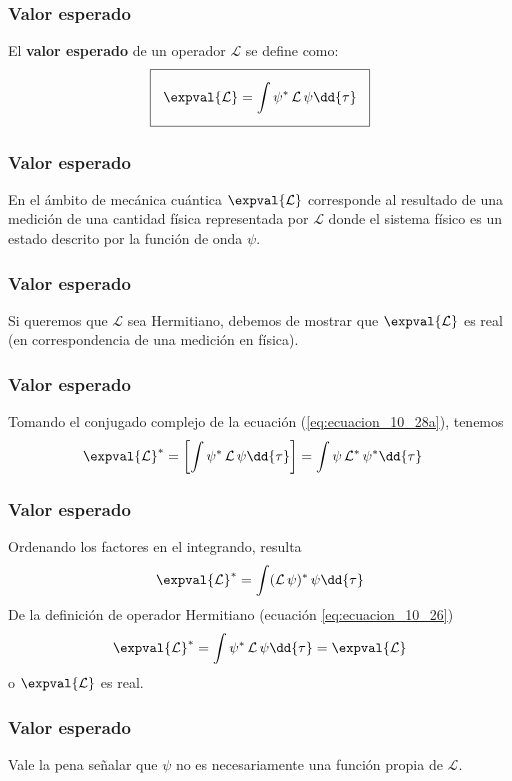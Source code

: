 \begin{frame}
\frametitle{Valor esperado}
El \textbf{valor esperado} de un operador $\mathcal{L}$ se define como:
\begin{align}
\setlength{\fboxsep}{3\fboxsep}\boxed{\expval{\mathcal{L}} = \int \psi^{*} \, \mathcal{L} \, \psi \dd{\tau}}
\label{eq:ecuacion_10_28a}
\end{align}
\end{frame}
\begin{frame}
\frametitle{Valor esperado}
En el ámbito de mecánica cuántica $\expval{\mathcal{L}}$ corresponde al resultado de una medición de una cantidad física representada por $\mathcal{L}$ donde el sistema físico es un estado descrito por la función de onda $\psi$. 
\end{frame}
\begin{frame}
\frametitle{Valor esperado}
Si queremos que $\mathcal{L}$ sea Hermitiano, debemos de mostrar que $\expval{\mathcal{L}}$ es real (en correspondencia de una medición en física).
\end{frame}
\begin{frame}
\frametitle{Valor esperado}
Tomando el conjugado complejo de la ecuación (\ref{eq:ecuacion_10_28a}), tenemos
\begin{align*}
\expval{\mathcal{L}}^{*} &= \left[ \int \psi^{*} \, \mathcal{L} \, \psi \dd{\tau} \right] = \int \psi \, \mathcal{L}^{*} \, \psi^{*} \dd{\tau}
\end{align*}
\end{frame}
\begin{frame}
\frametitle{Valor esperado}
Ordenando los factores en el integrando, resulta
\begin{align*}
\expval{\mathcal{L}}^{*} = \int (\mathcal{L} \, \psi)^{*} \, \psi \dd{\tau}
\end{align*}
\pause
De la definición de operador Hermitiano (ecuación \ref{eq:ecuacion_10_26})
\begin{equation}
\expval{\mathcal{L}}^{*} = \int \psi^{*} \, \mathcal{L} \, \psi \dd{\tau} = \expval{\mathcal{L}} 
\label{eq:ecuacion_10_28b}
\end{equation}
o $\expval{\mathcal{L}}$ es real.
\end{frame}
\begin{frame}
\frametitle{Valor esperado}
Vale la pena señalar que $\psi$ no es necesariamente una función propia de $\mathcal{L}$.
\end{frame}
